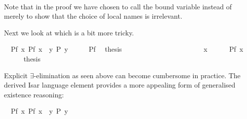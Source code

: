 \begin{isabellebody}
\isacommand{{\isachardot}{\isachardot}}\ \ %
\isanewline
\isamarkupfalse%
\isamarkupfalse%
%
\begin{isamarkuptext}%
\noindent Note that in the proof we have chosen to call the bound
variable  instead of  merely to show that the choice of
local names is irrelevant.

Next we look at \isa{{\isasymexists}} which is a bit more tricky.%
\end{isamarkuptext}%
\isamarkuptrue%
\ \ Pf{\isacharcolon}\ {\isachardoublequote}{\isasymexists}x{\isachardot}\ P{\isacharparenleft}f\ x{\isacharparenright}{\isachardoublequote}\ \ {\isachardoublequote}{\isasymexists}y{\isachardot}\ P\ y{\isachardoublequote}\isanewline
\isamarkupfalse%
\ {\isacharminus}\isanewline
\ \ \isamarkupfalse%
\ Pf\ \isamarkupfalse%
\ {\isacharquery}thesis\isanewline
\ \ \isamarkupfalse%
\ \ \ \ \ \ \ \ \ \ \ \ \ \ %
\isanewline
\ \ \ \ \isamarkupfalse%
\ x\isanewline
\ \ \ \ \isamarkupfalse%
\ {\isachardoublequote}P{\isacharparenleft}f\ x{\isacharparenright}{\isachardoublequote}\isanewline
\ \ \ \ \isamarkupfalse%
\ {\isacharquery}thesis\ \isamarkupfalse%
\isacommand{{\isachardot}{\isachardot}}\ \ %
\isanewline
\ \ \isamarkupfalse%
\isanewline
\isamarkupfalse%
\isamarkupfalse%
%
\begin{isamarkuptext}%
\noindent Explicit $\exists$-elimination as seen above can become
cumbersome in practice.  The derived Isar language element
 provides a more appealing form of generalised
existence reasoning:%
\end{isamarkuptext}%
\isamarkuptrue%
\ \ Pf{\isacharcolon}\ {\isachardoublequote}{\isasymexists}x{\isachardot}\ P{\isacharparenleft}f\ x{\isacharparenright}{\isachardoublequote}\ \ {\isachardoublequote}{\isasymexists}y{\isachardot}\ P\ y{\isachardoublequote}\isanewline

\end{isabellebody}
